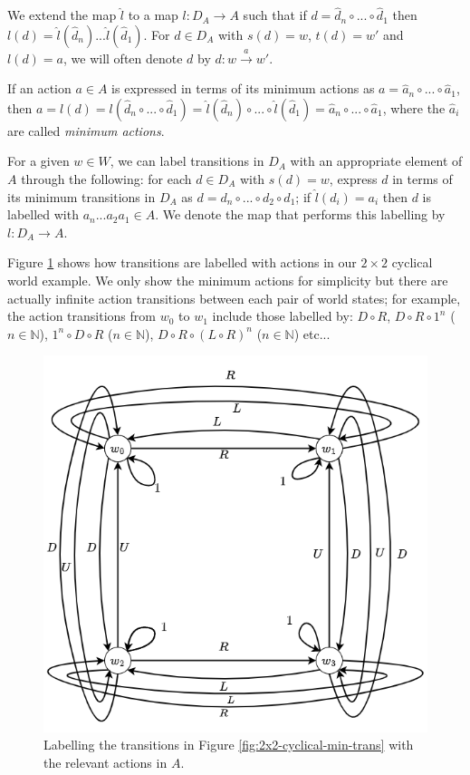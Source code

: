 We extend the map $\hat{l}$ to a map $l: D_{A} \to A$ such that if $d = \hat{d}_{n} \circ ... \circ \hat{d}_{1}$ then $l(d) = \hat{l}(\hat{d}_{n}) ... \hat{l}(\hat{d}_{1})$.
For $d \in D_{A}$ with $s(d) = w$, $t(d) = w'$ and $l(d) = a$, we will often denote $d$ by $d: w \xrightarrow{a} w'$.

If an action $a \in A$ is expressed in terms of its minimum actions as $a = \hat{a}_{n} \circ ... \circ \hat{a}_{1}$, then $a = l(d) = l(\hat{d}_{n} \circ ... \circ \hat{d}_{1}) = \hat{l}(\hat{d}_{n}) \circ ... \circ \hat{l}(\hat{d}_{1}) = \hat{a}_{n} \circ ... \circ \hat{a}_{1}$, where the $\hat{a}_{i}$ are called \textit{minimum actions}.


\begin{remark}
    For a given $w \in W$, we can label transitions in $D_{A}$ with an appropriate element of $A$ through the following: for each $d \in D_{A}$ with $s(d)=w$, express $d$ in terms of its minimum transitions in $D_{A}$ as $d = d_{n} \circ ... \circ d_{2} \circ d_{1}$; if $\hat{l}(d_{i}) = a_{i}$ then $d$ is labelled with $a_{n}...a_{2}a_{1} \in A$.
    We denote the map that performs this labelling by $l: D_{A} \to A$.
\end{remark}

Figure \ref{fig:2x2-cyclical-min-actions-standard} shows how transitions are labelled with actions in our $2 \times 2$ cyclical world example.
We only show the minimum actions for simplicity but there are actually infinite action transitions between each pair of world states; for example, the action transitions from $w_{0}$ to $w_{1}$ include those labelled by: $D \circ R$, $D \circ R \circ 1^{n}$ ($n \in \mathbb{N}$), $1^{n} \circ D \circ R$ ($n \in \mathbb{N}$), $D \circ R \circ (L \circ R)^{n}$ ($n \in \mathbb{N}$) etc...

\begin{figure}
    \centering
    \includegraphics[width=0.5\linewidth]{2MathematicalFramework/InitialFramework/Images/2x2-cyclical-min-actions.drawio.png}
    \caption{Labelling the transitions in Figure \ref{fig:2x2-cyclical-min-trans} with the relevant actions in $A$.}
    \label{fig:2x2-cyclical-min-actions-standard}
\end{figure}

